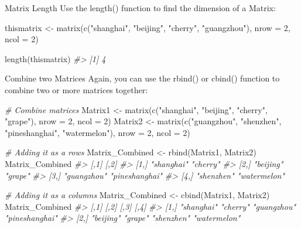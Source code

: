 \documentclass[
]{book}
\newenvironment{Shaded}{\begin{snugshade}}{\end{snugshade}}
\newcommand{\AttributeTok}[1]{\textcolor[rgb]{0.77,0.63,0.00}{#1}}
\newcommand{\CommentTok}[1]{\textcolor[rgb]{0.56,0.35,0.01}{\textit{#1}}}
\newcommand{\DecValTok}[1]{\textcolor[rgb]{0.00,0.00,0.81}{#1}}
\newcommand{\FunctionTok}[1]{\textcolor[rgb]{0.00,0.00,0.00}{#1}}
\newcommand{\NormalTok}[1]{#1}
\newcommand{\OtherTok}[1]{\textcolor[rgb]{0.56,0.35,0.01}{#1}}
\newcommand{\StringTok}[1]{\textcolor[rgb]{0.31,0.60,0.02}{#1}}
\begin{document}
Matrix Length
Use the length() function to find the dimension of a Matrix:

\begin{Shaded}
\begin{Highlighting}[]
\NormalTok{thismatrix }\OtherTok{\textless{}{-}} \FunctionTok{matrix}\NormalTok{(}\FunctionTok{c}\NormalTok{(}\StringTok{"shanghai"}\NormalTok{, }\StringTok{"beijing"}\NormalTok{, }\StringTok{"cherry"}\NormalTok{, }\StringTok{"guangzhou"}\NormalTok{), }\AttributeTok{nrow =} \DecValTok{2}\NormalTok{, }\AttributeTok{ncol =} \DecValTok{2}\NormalTok{)}

\FunctionTok{length}\NormalTok{(thismatrix)}
\CommentTok{\#\textgreater{} [1] 4}
\end{Highlighting}
\end{Shaded}

Combine two Matrices
Again, you can use the rbind() or cbind() function to combine two or more matrices together:

\begin{Shaded}
\begin{Highlighting}[]
\CommentTok{\# Combine matrices}
\NormalTok{Matrix1 }\OtherTok{\textless{}{-}} \FunctionTok{matrix}\NormalTok{(}\FunctionTok{c}\NormalTok{(}\StringTok{"shanghai"}\NormalTok{, }\StringTok{"beijing"}\NormalTok{, }\StringTok{"cherry"}\NormalTok{, }\StringTok{"grape"}\NormalTok{), }\AttributeTok{nrow =} \DecValTok{2}\NormalTok{, }\AttributeTok{ncol =} \DecValTok{2}\NormalTok{)}
\NormalTok{Matrix2 }\OtherTok{\textless{}{-}} \FunctionTok{matrix}\NormalTok{(}\FunctionTok{c}\NormalTok{(}\StringTok{"guangzhou"}\NormalTok{, }\StringTok{"shenzhen"}\NormalTok{, }\StringTok{"pineshanghai"}\NormalTok{, }\StringTok{"watermelon"}\NormalTok{), }\AttributeTok{nrow =} \DecValTok{2}\NormalTok{, }\AttributeTok{ncol =} \DecValTok{2}\NormalTok{)}

\CommentTok{\# Adding it as a rows}
\NormalTok{Matrix\_Combined }\OtherTok{\textless{}{-}} \FunctionTok{rbind}\NormalTok{(Matrix1, Matrix2)}
\NormalTok{Matrix\_Combined}
\CommentTok{\#\textgreater{}      [,1]        [,2]          }
\CommentTok{\#\textgreater{} [1,] "shanghai"  "cherry"      }
\CommentTok{\#\textgreater{} [2,] "beijing"   "grape"       }
\CommentTok{\#\textgreater{} [3,] "guangzhou" "pineshanghai"}
\CommentTok{\#\textgreater{} [4,] "shenzhen"  "watermelon"}

\CommentTok{\# Adding it as a columns}
\NormalTok{Matrix\_Combined }\OtherTok{\textless{}{-}} \FunctionTok{cbind}\NormalTok{(Matrix1, Matrix2)}
\NormalTok{Matrix\_Combined}
\CommentTok{\#\textgreater{}      [,1]       [,2]     [,3]        [,4]          }
\CommentTok{\#\textgreater{} [1,] "shanghai" "cherry" "guangzhou" "pineshanghai"}
\CommentTok{\#\textgreater{} [2,] "beijing"  "grape"  "shenzhen"  "watermelon"}
\end{Highlighting}
\end{Shaded}
\end{document}
